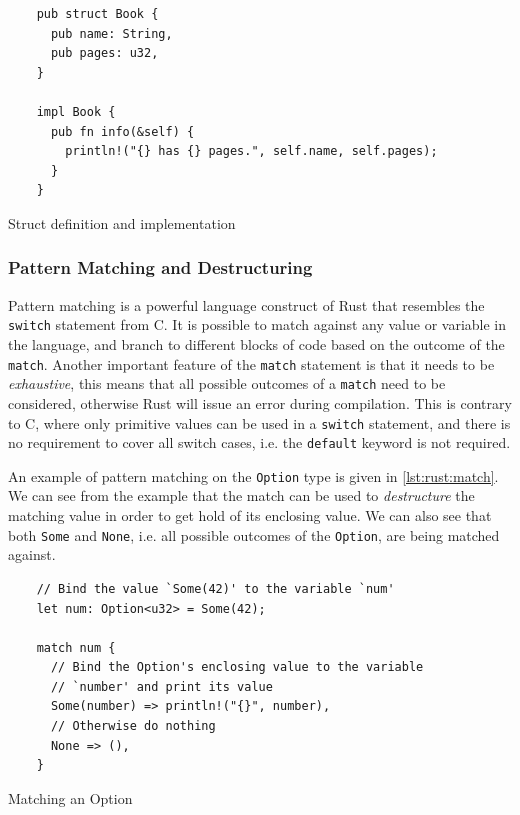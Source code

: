 \begin{listing}[H]
  \begin{verbatim}
    pub struct Book {
      pub name: String,
      pub pages: u32,
    }

    impl Book {
      pub fn info(&self) {
        println!("{} has {} pages.", self.name, self.pages);
      }
    }
  \end{verbatim}
  \caption{Struct definition and implementation}
  \label{lst:book_struct}
\end{listing}

\subsubsection{Pattern Matching and Destructuring}
\label{sub:pattern_matching}

Pattern matching is a powerful language construct of Rust that resembles the \texttt{switch} statement from C.
It is possible to match against any value or variable in the language, and branch to different blocks of code based on the outcome of the \texttt{match}.
Another important feature of the \texttt{match} statement is that it needs to be \emph{exhaustive}, this means that all possible outcomes of a \texttt{match} need to be considered, otherwise Rust will issue an error during compilation.
This is contrary to C, where only primitive values can be used in a \texttt{switch} statement, and there is no requirement to cover all switch cases, i.e. the \texttt{default} keyword is not required.

An example of pattern matching on the \texttt{Option} type is given in \autoref{lst:rust:match}.
We can see from the example that the match can be used to \emph{destructure} the matching value in order to get hold of its enclosing value.
We can also see that both \texttt{Some} and \texttt{None}, i.e. all possible outcomes of the \texttt{Option}, are being matched against.

\begin{listing}[H]
  \begin{verbatim}
    // Bind the value `Some(42)' to the variable `num'
    let num: Option<u32> = Some(42);

    match num {
      // Bind the Option's enclosing value to the variable
      // `number' and print its value
      Some(number) => println!("{}", number),
      // Otherwise do nothing
      None => (),
    }
  \end{verbatim}
  \caption{Matching an Option}
  \label{lst:rust:match}
\end{listing}

